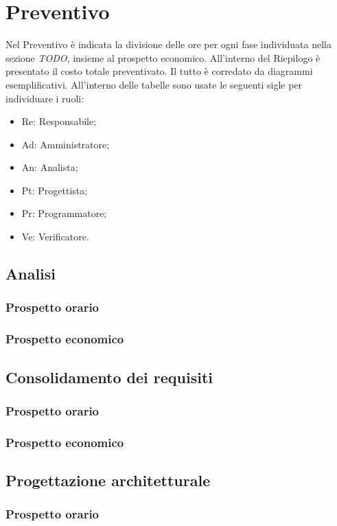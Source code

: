 \section{Preventivo}
Nel Preventivo è indicata la divisione delle ore per ogni fase individuata nella sezione \textit{TODO}, insieme al prospetto economico. All'interno del Riepilogo è presentato il costo totale preventivato. Il tutto è corredato da diagrammi esemplificativi.
All'interno delle tabelle sono usate le seguenti sigle per individuare i ruoli:
\begin{itemize}
    \item Re: Responsabile;
    \item Ad: Amministratore;
    \item An: Analista;
    \item Pt: Progettista;
    \item Pr: Programmatore;
    \item Ve: Verificatore.
\end{itemize}
\subsection{Analisi}
    \subsubsection{Prospetto orario}
    \subsubsection{Prospetto economico}
\subsection{Consolidamento dei requisiti}
    \subsubsection{Prospetto orario}
    \subsubsection{Prospetto economico}
\subsection{Progettazione architetturale}
    \subsubsection{Prospetto orario}
